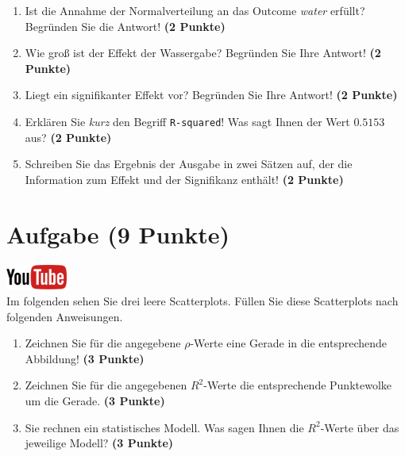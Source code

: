 \documentclass[a4paper, 9pt]{scrartcl}\usepackage[]{graphicx}\usepackage[]{xcolor}
\begin{document}
\begin{enumerate}
\item Ist die Annahme der Normalverteilung an das Outcome \textit{water}
  erf{\"u}llt?  Begr{\"u}nden Sie die Antwort! \textbf{(2 Punkte)}
\item Wie gro{\ss} ist der Effekt der Wassergabe?  Begr{\"u}nden Sie Ihre Antwort! \textbf{(2 Punkte)} 
\item Liegt ein signifikanter
  Effekt vor? Begr{\"u}nden Sie Ihre Antwort! \textbf{(2 Punkte)}
\item Erkl{\"a}ren Sie \textit{kurz} den Begriff \texttt{R-squared}!
  Was sagt Ihnen der Wert $0.5153$ aus? \textbf{(2 Punkte)}
\item Schreiben Sie das Ergebnis der \Rlogo Ausgabe in zwei S{\"a}tzen auf, der die
  Information zum Effekt und der Signifikanz enth{\"a}lt! \textbf{(2 Punkte)} 
\end{enumerate}
 
\clearpage

\section{Aufgabe \hfill (9 Punkte)}

\hfill\href{https://youtu.be/fB6nF4dxodA}{\includegraphics[width =
  2cm]{img/youtube}}\\[1Ex]


Im folgenden sehen Sie drei leere Scatterplots. F{\"u}llen Sie diese
Scatterplots nach folgenden Anweisungen.

\begin{enumerate}
\item Zeichnen Sie f{\"u}r die angegebene $\rho$-Werte eine Gerade in die
  entsprechende Abbildung! \textbf{(3 Punkte)}
\item Zeichnen Sie f{\"u}r die angegebenen $R^2$-Werte die entsprechende
  Punktewolke um die Gerade. \textbf{(3 Punkte)}
\item Sie rechnen ein statistisches Modell. Was sagen Ihnen die $R^2$-Werte
  {\"u}ber das jeweilige Modell? \textbf{(3 Punkte)}
\end{enumerate}
\end{document}
